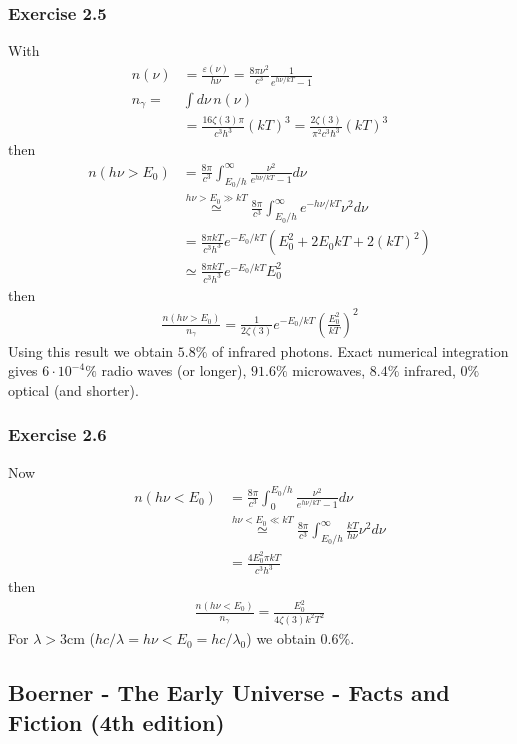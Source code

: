 \documentclass[10pt,a4paper]{article}
\theoremstyle{definition}
\begin{document}
\subsubsection{Exercise 2.5}
With
\begin{align}
n(\nu)&=\frac{\varepsilon(\nu)}{h\nu}=\frac{8\pi\nu^2}{c^3}\frac{1}{e^{h\nu/kT}-1}\\
n_\gamma=&\int d\nu\,n(\nu)\\
&=\frac{16\zeta(3)\pi}{c^3h^3}(kT)^3
=\frac{2\zeta(3)}{\pi^2c^3\hbar^3}(kT)^3
\end{align}
then
\begin{align}
n(h\nu>E_0)&=\frac{8\pi}{c^3}\int_{E_0/h}^\infty\frac{\nu^2}{e^{h\nu/kT}-1}d\nu\\
&\overset{h\nu>E_0\gg kT}{\simeq}\frac{8\pi}{c^3}\int_{E_0/h}^\infty e^{-h\nu/kT}\nu^2 d\nu\\
&=\frac{8\pi kT}{c^3h^3}e^{-E_0/kT}(E_0^2+2E_0kT+2(kT)^2)\\
&\simeq\frac{8\pi kT}{c^3h^3}e^{-E_0/kT}E_0^2
\end{align}
then
\begin{align}
\frac{n(h\nu>E_0)}{n_\gamma}=\frac{1}{2\zeta(3)}e^{-E_0/kT}\left(\frac{E_0^2}{kT}\right)^2
\end{align}
Using this result we obtain $5.8\%$ of infrared photons. Exact numerical integration gives $6\cdot10^{-4}\%$ radio waves (or longer), $91.6\%$ microwaves, $8.4\%$ infrared, $0\%$ optical (and shorter).

\subsubsection{Exercise 2.6}
Now
\begin{align}
n(h\nu<E_0)&=\frac{8\pi}{c^3}\int_0^{E_0/h}\frac{\nu^2}{e^{h\nu/kT}-1}d\nu\\
&\overset{h\nu<E_0\ll kT}{\simeq}\frac{8\pi}{c^3}\int_{E_0/h}^\infty \frac{kT}{h\nu}\nu^2d\nu\\
&=\frac{4E_0^2 \pi kT}{c^3h^3}
\end{align}
then
\begin{align}
\frac{n(h\nu<E_0)}{n_\gamma}=\frac{E_0^2}{4\zeta(3)k^2T^2}
\end{align}
For $\lambda>3$cm ($hc/\lambda=h\nu<E_0=hc/\lambda_0$) we obtain $0.6\%$.

\subsection{{\sc Boerner} - The Early Universe - Facts and Fiction (4th edition)}
\end{document}
